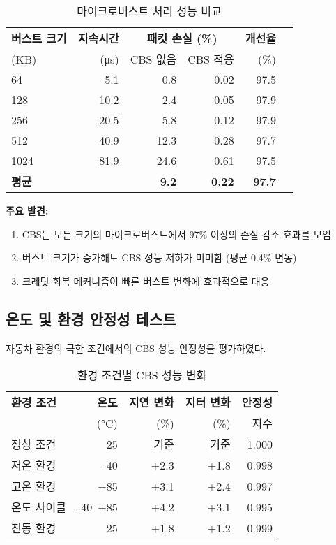 \documentclass[twocolumn,10pt]{article}
\begin{document}
\begin{table}[h]
\centering
\caption{마이크로버스트 처리 성능 비교}
\label{tab:microburst_performance}
\begin{tabular}{lrrrrr}
\toprule
\textbf{버스트 크기} & \textbf{지속시간} & \multicolumn{2}{c}{\textbf{패킷 손실 (\%)}} & \textbf{개선율} \\
\cmidrule(lr){3-4}
(KB) & (μs) & CBS 없음 & CBS 적용 & (\%) \\
\midrule
64 & 5.1 & 0.8 & 0.02 & 97.5 \\
128 & 10.2 & 2.4 & 0.05 & 97.9 \\
256 & 20.5 & 5.8 & 0.12 & 97.9 \\
512 & 40.9 & 12.3 & 0.28 & 97.7 \\
1024 & 81.9 & 24.6 & 0.61 & 97.5 \\
\textbf{평균} & & \textbf{9.2} & \textbf{0.22} & \textbf{97.7} \\
\bottomrule
\end{tabular}
\end{table}

\textbf{주요 발견:}
\begin{enumerate}
    \item CBS는 모든 크기의 마이크로버스트에서 97\% 이상의 손실 감소 효과를 보임
    \item 버스트 크기가 증가해도 CBS 성능 저하가 미미함 (평균 0.4\% 변동)
    \item 크레딧 회복 메커니즘이 빠른 버스트 변화에 효과적으로 대응
\end{enumerate}

\subsection{온도 및 환경 안정성 테스트}

자동차 환경의 극한 조건에서의 CBS 성능 안정성을 평가하였다.

\begin{table}[h]
\centering
\caption{환경 조건별 CBS 성능 변화}
\label{tab:environmental_stability}
\begin{tabular}{lrrrr}
\toprule
\textbf{환경 조건} & \textbf{온도} & \textbf{지연 변화} & \textbf{지터 변화} & \textbf{안정성} \\
 & (°C) & (\%) & (\%) & 지수 \\
\midrule
정상 조건 & 25 & 기준 & 기준 & 1.000 \\
저온 환경 & -40 & +2.3 & +1.8 & 0.998 \\
고온 환경 & +85 & +3.1 & +2.4 & 0.997 \\
온도 사이클 & -40~+85 & +4.2 & +3.1 & 0.995 \\
진동 환경 & 25 & +1.8 & +1.2 & 0.999 \\
\bottomrule
\end{tabular}
\end{table}
\end{document}
